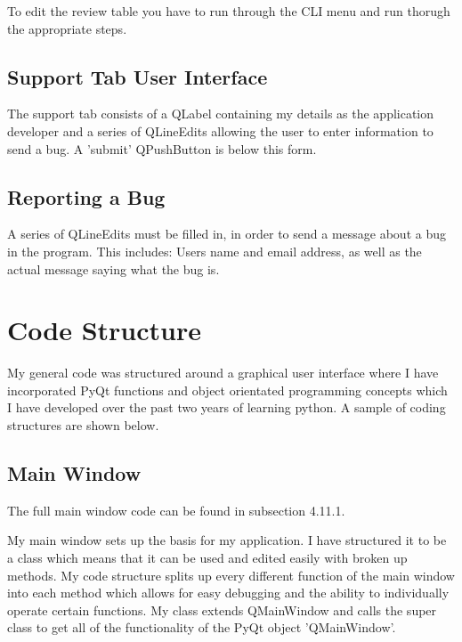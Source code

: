 To edit the review table you have to run through the CLI menu and run thorugh the appropriate steps.



\subsection{Support Tab User Interface}

The support tab consists of a QLabel containing my details as the application developer and a series of QLineEdits allowing the user to enter information to send a bug. A 'submit' QPushButton is below this form.

\subsection{Reporting a Bug}

A series of QLineEdits must be filled in, in order to send a message about a bug in the program. This includes: Users name and email address, as well as the actual message saying what the bug is. 










\section{Code Structure}

My general code was structured around a graphical user interface where I have incorporated PyQt functions and object orientated programming concepts which I have developed over the past two years of learning python. A sample of coding structures are shown below.


\subsection{Main Window}

The full main window code can be found in subsection 4.11.1.


My main window sets up the basis for my application. I have structured it to be a class which means that it can be used and edited easily with broken up methods. My code structure splits up every different function of the main window into each method which allows for easy debugging and the ability to individually operate certain functions. My class extends QMainWindow and calls the super class to get all of the functionality of the PyQt object 'QMainWindow'.


